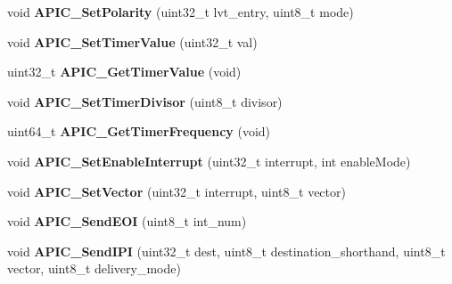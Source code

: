 \begin{DoxyCompactItemize}
\item 
void {\bfseries A\+P\+I\+C\+\_\+\+Set\+Polarity} (uint32\+\_\+t lvt\+\_\+entry, uint8\+\_\+t mode)\hypertarget{group__apic__driver_ga338964cf0e3235f88411662653cb54e0}{}\label{group__apic__driver_ga338964cf0e3235f88411662653cb54e0}

\item 
void {\bfseries A\+P\+I\+C\+\_\+\+Set\+Timer\+Value} (uint32\+\_\+t val)\hypertarget{group__apic__driver_gaa2bef6a63404cb4f85925ca49ea5470b}{}\label{group__apic__driver_gaa2bef6a63404cb4f85925ca49ea5470b}

\item 
uint32\+\_\+t {\bfseries A\+P\+I\+C\+\_\+\+Get\+Timer\+Value} (void)\hypertarget{group__apic__driver_gae34fc48e7fc158f0c8fbb965f9d84174}{}\label{group__apic__driver_gae34fc48e7fc158f0c8fbb965f9d84174}

\item 
void {\bfseries A\+P\+I\+C\+\_\+\+Set\+Timer\+Divisor} (uint8\+\_\+t divisor)\hypertarget{group__apic__driver_ga088c8596a05c4c8fb6cee02f8df1b3b2}{}\label{group__apic__driver_ga088c8596a05c4c8fb6cee02f8df1b3b2}

\item 
uint64\+\_\+t {\bfseries A\+P\+I\+C\+\_\+\+Get\+Timer\+Frequency} (void)\hypertarget{group__apic__driver_ga2527c4a927ccf0f8d117aa370537f65c}{}\label{group__apic__driver_ga2527c4a927ccf0f8d117aa370537f65c}

\item 
void {\bfseries A\+P\+I\+C\+\_\+\+Set\+Enable\+Interrupt} (uint32\+\_\+t interrupt, int enable\+Mode)\hypertarget{group__apic__driver_gac9a5dc52984c1fb2e032e7403d18f52f}{}\label{group__apic__driver_gac9a5dc52984c1fb2e032e7403d18f52f}

\item 
void {\bfseries A\+P\+I\+C\+\_\+\+Set\+Vector} (uint32\+\_\+t interrupt, uint8\+\_\+t vector)\hypertarget{group__apic__driver_gad0d564b9df347940808e87010b80d0ec}{}\label{group__apic__driver_gad0d564b9df347940808e87010b80d0ec}

\item 
void {\bfseries A\+P\+I\+C\+\_\+\+Send\+E\+OI} (uint8\+\_\+t int\+\_\+num)\hypertarget{group__apic__driver_ga83b71d578ccb3974b3d469eae6283827}{}\label{group__apic__driver_ga83b71d578ccb3974b3d469eae6283827}

\item 
void {\bfseries A\+P\+I\+C\+\_\+\+Send\+I\+PI} (uint32\+\_\+t dest, uint8\+\_\+t destination\+\_\+shorthand, uint8\+\_\+t vector, uint8\+\_\+t delivery\+\_\+mode)\hypertarget{group__apic__driver_gad5da4d424bb7c7c509b12c6854e712fb}{}\label{group__apic__driver_gad5da4d424bb7c7c509b12c6854e712fb}


\end{DoxyCompactItemize}
